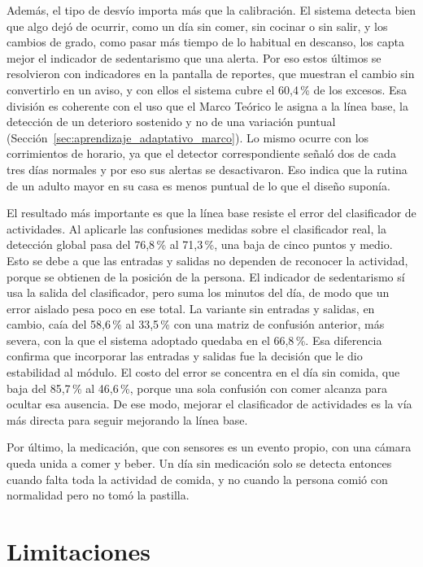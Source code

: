 Además, el tipo de desvío importa más que la calibración.
El sistema detecta bien que algo dejó de ocurrir, como un día sin comer, sin cocinar o sin salir, y los cambios de grado, como pasar más tiempo de lo habitual en descanso, los capta mejor el indicador de sedentarismo que una alerta.
Por eso estos últimos se resolvieron con indicadores en la pantalla de reportes, que muestran el cambio sin convertirlo en un aviso, y con ellos el sistema cubre el 60,4\,\% de los excesos.
Esa división es coherente con el uso que el Marco Teórico le asigna a la línea base, la detección de un deterioro sostenido y no de una variación puntual (Sección~\ref{sec:aprendizaje_adaptativo_marco}).
Lo mismo ocurre con los corrimientos de horario, ya que el detector correspondiente señaló dos de cada tres días normales y por eso sus alertas se desactivaron.
Eso indica que la rutina de un adulto mayor en su casa es menos puntual de lo que el diseño suponía.

El resultado más importante es que la línea base resiste el error del clasificador de actividades.
Al aplicarle las confusiones medidas sobre el clasificador real, la detección global pasa del 76,8\,\% al 71,3\,\%, una baja de cinco puntos y medio.
Esto se debe a que las entradas y salidas no dependen de reconocer la actividad, porque se obtienen de la posición de la persona.
El indicador de sedentarismo sí usa la salida del clasificador, pero suma los minutos del día, de modo que un error aislado pesa poco en ese total.
La variante sin entradas y salidas, en cambio, caía del 58,6\,\% al 33,5\,\% con una matriz de confusión anterior, más severa, con la que el sistema adoptado quedaba en el 66,8\,\%.
Esa diferencia confirma que incorporar las entradas y salidas fue la decisión que le dio estabilidad al módulo.
El costo del error se concentra en el día sin comida, que baja del 85,7\,\% al 46,6\,\%, porque una sola confusión con comer alcanza para ocultar esa ausencia.
De ese modo, mejorar el clasificador de actividades es la vía más directa para seguir mejorando la línea base.

Por último, la medicación, que con sensores es un evento propio, con una cámara queda unida a comer y beber.
Un día sin medicación solo se detecta entonces cuando falta toda la actividad de comida, y no cuando la persona comió con normalidad pero no tomó la pastilla.

\section{Limitaciones}
\label{sec:limitaciones}

